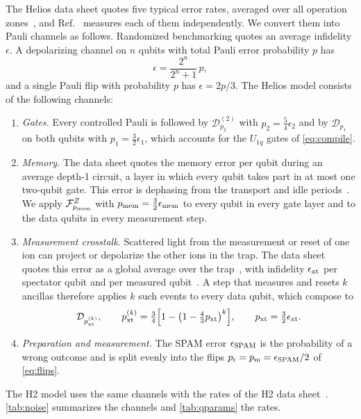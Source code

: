 The Helios data sheet quotes five typical error rates, averaged over all operation zones~\cite{helios_datasheet}, and Ref.~\cite{ransford2026} measures each of them independently. We convert them into Pauli channels as follows. Randomized benchmarking quotes an average infidelity $\epsilon$. A depolarizing channel on $n$ qubits with total Pauli error probability $p$ has
\begin{equation}
  \epsilon=\frac{2^n}{2^n+1}\,p,
  \label{eq:infidelity}
\end{equation}
and a single Pauli flip with probability $p$ has $\epsilon=2p/3$. The Helios model consists of the following channels:
\begin{enumerate}
  \item \emph{Gates.} Every controlled Pauli is followed by $\mathcal{D}^{(2)}_{p_2}$ with $p_2=\tfrac{5}{4}\epsilon_2$ and by $\mathcal{D}_{p_1}$ on both qubits with $p_1=\tfrac{3}{2}\epsilon_1$, which accounts for the $U_{1q}$ gates of \autoref{eq:compile}.
  \item \emph{Memory.} The data sheet quotes the memory error per qubit during an average depth-1 circuit, a layer in which every qubit takes part in at most one two-qubit gate. This error is dephasing from the transport and idle periods~\cite{ransford2026}. We apply $\mathcal{F}^{Z}_{p_{\rm mem}}$ with $p_{\rm mem}=\tfrac{3}{2}\epsilon_{\rm mem}$ to every qubit in every gate layer and to the data qubits in every measurement step.
  \item \emph{Measurement crosstalk.} Scattered light from the measurement or reset of one ion can project or depolarize the other ions in the trap. The data sheet quotes this error as a global average over the trap~\cite{helios_datasheet}, with infidelity $\epsilon_{\rm xt}$ per spectator qubit and per measured qubit~\cite{ransford2026}. A step that measures and resets $k$ ancillas therefore applies $k$ such events to every data qubit, which compose to
  \begin{equation}
    \mathcal{D}_{p_{\rm xt}^{(k)}},\qquad p_{\rm xt}^{(k)}=\tfrac{3}{4}\Big[1-\big(1-\tfrac{4}{3}p_{\rm xt}\big)^{k}\Big],\qquad p_{\rm xt}=\tfrac{3}{2}\epsilon_{\rm xt}.
    \label{eq:xtalk}
  \end{equation}
  \item \emph{Preparation and measurement.} The SPAM error $\epsilon_{\rm SPAM}$ is the probability of a wrong outcome and is split evenly into the flips $p_{\rm r}=p_{\rm m}=\epsilon_{\rm SPAM}/2$ of \autoref{eq:flips}.
\end{enumerate}
The H2 model uses the same channels with the rates of the H2 data sheet~\cite{h2_datasheet}. \autoref{tab:noise} summarizes the channels and \autoref{tab:qparams} the rates.

